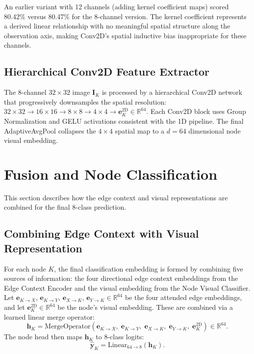 An earlier variant with 12 channels (adding kernel coefficient maps) scored 80.42\% versus 80.47\% for the 8-channel version. The kernel coefficient represents a derived linear relationship with no meaningful spatial structure along the observation axis, making Conv2D's spatial inductive bias inappropriate for these channels.

\subsection{Hierarchical Conv2D Feature Extractor}

The 8-channel $32 \times 32$ image $\mathbf{I}_K$ is processed by a hierarchical Conv2D network that progressively downsamples the spatial resolution: $32 \times 32 \to 16 \times 16 \to 8 \times 8 \to 4 \times 4 \to \mathbf{e}_K^{\mathrm{2D}} \in \mathbb{R}^{64}$. Each Conv2D block uses Group Normalization and GELU activations consistent with the 1D pipeline. The final AdaptiveAvgPool collapses the $4 \times 4$ spatial map to a $d = 64$ dimensional node visual embedding.

\section{Fusion and Node Classification}
\label{sec:fusion}

This section describes how the edge context and visual representations are combined for the final 8-class prediction.

\subsection{Combining Edge Context with Visual Representation}

For each node $K$, the final classification embedding is formed by combining five sources of information: the four directional edge context embeddings from the Edge Context Encoder and the visual embedding from the Node Visual Classifier. Let $\mathbf{e}_{K \to X}$, $\mathbf{e}_{K \to Y}$, $\mathbf{e}_{X \to K}$, $\mathbf{e}_{Y \to K} \in \mathbb{R}^{64}$ be the four attended edge embeddings, and let $\mathbf{e}_K^{\mathrm{2D}} \in \mathbb{R}^{64}$ be the node's visual embedding. These are combined via a learned linear merge operator:
\begin{equation}
\mathbf{h}_K = \mathrm{MergeOperator}\!\left(\mathbf{e}_{K \to X},\; \mathbf{e}_{K \to Y},\; \mathbf{e}_{X \to K},\; \mathbf{e}_{Y \to K},\; \mathbf{e}_K^{\mathrm{2D}}\right) \in \mathbb{R}^{64}.
\label{eq:node_merge}
\end{equation}
The node head then maps $\mathbf{h}_K$ to 8-class logits:
\begin{equation}
\hat{\mathbf{y}}_K = \mathrm{Linear}_{64 \to 8}(\mathbf{h}_K).
\label{eq:node_head}
\end{equation}

